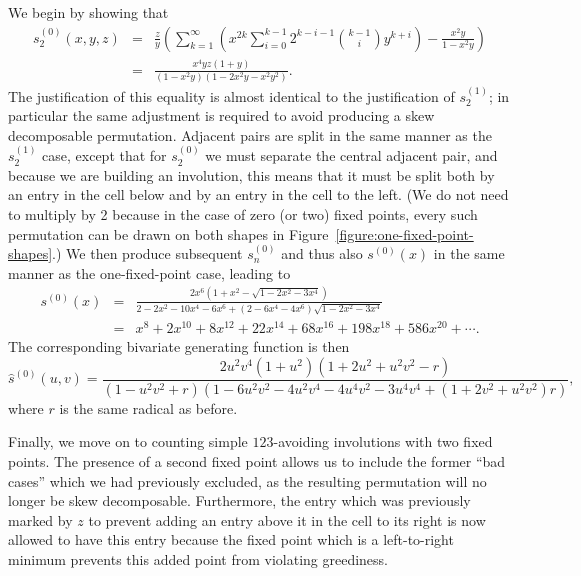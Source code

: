 \documentclass[10pt]{article}
\theoremstyle{plain}
\begin{document}
We begin by showing that
	\begin{eqnarray*}
	s^{(0)}_2(x,y,z)
	&=&
	\frac{z}{y}\left(\sum_{k=1}^\infty\left(x^{2k}\sum_{i=0}^{k-1} 2^{k-i-1}{k-1\choose i}y^{k+i}\right) - \frac{x^2y}{1-x^2y}\right)\\
	&=&
	\frac{x^4yz(1+y)}{(1-x^2y)(1-2x^2y-x^2y^2)}.
	\end{eqnarray*}
The justification of this equality is almost identical to the justification of $s^{(1)}_2$; in particular the same adjustment is required to avoid producing a skew decomposable permutation. Adjacent pairs are split in the same manner as the $s^{(1)}_2$ case, except that for $s^{(0)}_2$ we must separate the central adjacent pair, and because we are building an involution, this means that it must be split both by an entry in the cell below and by an entry in the cell to the left. (We do not need to multiply by 2 because in the case of zero (or two) fixed points, every such permutation can be drawn on both shapes in Figure~\ref{figure:one-fixed-point-shapes}.) We then produce subsequent $s^{(0)}_n$ and thus also $s^{(0)}(x)$ in the same manner as the one-fixed-point case, leading to
	\begin{eqnarray*}
	s^{(0)}(x)
	&=&
	\frac{2x^6(1+x^2-\sqrt{1-2x^2-3x^4})}{2-2x^2-10x^4-6x^6+(2-6x^4-4x^6)\sqrt{1-2x^2-3x^4}}\\
	&=&
	x^8+2x^{10}+8x^{12}+22x^{14}+68x^{16}+198x^{18}+586x^{20}+\cdots.
	\end{eqnarray*}
The corresponding bivariate generating function is then
	\[
	\widehat{s}^{(0)}(u,v)
	=
	\frac{2u^2v^4(1+u^2)(1+2u^2+u^2v^2-r)}
	{(1-u^2v^2+r)(1-6u^2v^2-4u^2v^4-4u^4v^2-3u^4v^4+(1+2v^2+u^2v^2)r)},
	\]
where $r$ is the same radical as before.

Finally, we move on to counting simple $123$-avoiding involutions with two fixed points. The presence of a second fixed point allows us to include the former ``bad cases'' which we had previously excluded, as the resulting permutation will no longer be skew decomposable. Furthermore, the entry which was previously marked by $z$ to prevent adding an entry above it in the cell to its right is now allowed to have this entry because the fixed point which is a left-to-right minimum prevents this added point from violating greediness.
\end{document}

